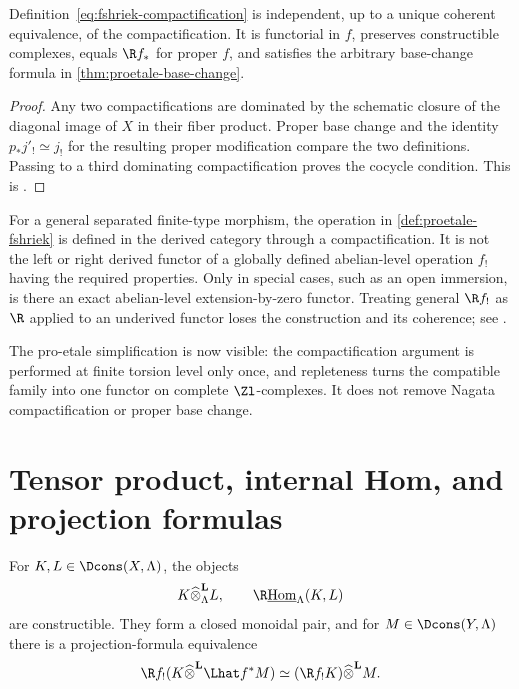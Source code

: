 \begin{theorem}
\label{thm:fshriek-independent}
Definition~\eqref{eq:fshriek-compactification} is independent, up to a
unique coherent equivalence, of the compactification.  It is functorial in
\(f\), preserves constructible complexes, equals \(\R f_*\) for proper
\(f\), and satisfies the arbitrary base-change formula in
\cref{thm:proetale-base-change}.
\end{theorem}

\begin{proof}
Any two compactifications are dominated by the schematic closure of the
diagonal image of \(X\) in their fiber product.  Proper base change and the
identity \(p_*j'_!\simeq j_!\) for the resulting proper modification compare
the two definitions.  Passing to a third dominating compactification proves
the cocycle condition.  This is
\cite[Definition~6.7.6 and Lemmas~6.7.7 and 6.7.10]
{BhattScholzeProEtale}.
\end{proof}

\begin{warning}
For a general separated finite-type morphism, the operation in
\cref{def:proetale-fshriek} is defined in the derived category through a
compactification.  It is not the left or right derived functor of a globally
defined abelian-level operation \(f_!\) having the required properties.
Only in special cases, such as an open immersion, is there an exact
abelian-level extension-by-zero functor.  Treating general \(\R f_!\) as
\(\R\) applied to an underived functor loses the construction and its
coherence; see \cite[Remarks~6.7.8--6.7.9]{BhattScholzeProEtale}.
\end{warning}

\begin{proetalebox}
The pro-etale simplification is now visible: the compactification argument is
performed at finite torsion level only once, and repleteness turns the
compatible family into one functor on complete \(\Zl\)-complexes.  It does
not remove Nagata compactification or proper base change.
\end{proetalebox}


\section{Tensor product, internal Hom, and projection formulas}

\begin{proposition}
\label{prop:proetale-tensor-hom}
For \(K,L\in\Dcons(X,\Lambda)\), the objects
\[
 K\widehat\otimes^{\mathbf L}_{\Lambda}L,
 \qquad
 \R\underline{\operatorname{Hom}}_{\Lambda}(K,L)
\]
are constructible.  They form a closed monoidal pair, and for
\(M\in\Dcons(Y,\Lambda)\) there is a projection-formula equivalence
\begin{equation}
\label{eq:fshriek-projection}
 \R f_!(K\widehat\otimes^{\mathbf L}\Lhat f^*M)
   \simeq
 (\R f_!K)\widehat\otimes^{\mathbf L}M.
\end{equation}
\end{proposition}

